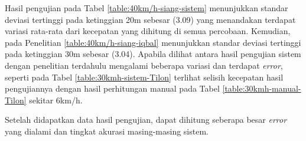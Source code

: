Hasil pengujian pada Tabel \ref{table:40km/h-siang-sistem} menunjukkan standar deviasi tertinggi pada ketinggian 20m sebesar (3.09) yang menandakan terdapat variasi rata-rata dari kecepatan yang dihitung di semua percobaan. Kemudian, pada Penelitian \ref{table:40km/h-siang-iqbal} menunjukkan standar deviasi tertinggi pada ketinggian 30m sebesar (3.04). Apabila dilihat antara hasil pengujian sistem dengan penelitian terdahulu mengalami beberapa variasi dan terdapat \emph{error}, seperti pada Tabel \ref{table:30kmh-sistem-Tilon} terlihat selisih kecepatan hasil pengujiannya dengan hasil perhitungan manual pada Tabel \ref{table:30kmh-manual-Tilon} sekitar 6km/h.

Setelah didapatkan data hasil pengujian, dapat dihitung seberapa besar \emph{error} yang dialami dan tingkat akurasi masing-masing sistem.

